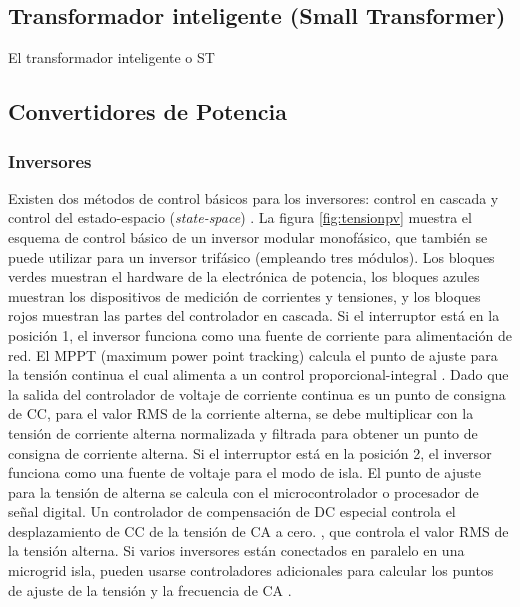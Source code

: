 \documentclass[12pt, letterpaper]{report}
\begin{document}
\subsection{Transformador inteligente (Small Transformer)}
El transformador inteligente o \ac{ST} \cite{Colak2015}


\subsection{Convertidores de Potencia}

\subsubsection{Inversores}

Existen dos métodos de control básicos para los inversores: control en cascada y
control del estado-espacio (\textit{state-space}) \cite{Bacha2015}. La figura \ref{fig:tensionpv} muestra el esquema de control básico de un inversor modular monofásico, que también se puede utilizar  para un inversor trifásico (empleando tres módulos). Los bloques verdes muestran el hardware de la electrónica de potencia, los bloques azules muestran los dispositivos de medición de corrientes y tensiones, y los bloques rojos muestran las partes del controlador en cascada.
Si el interruptor está en la posición 1, el inversor funciona como una fuente de corriente para alimentación de red. El MPPT (maximum
power point tracking) calcula el punto de ajuste para la tensión continua el cual alimenta a un control  proporcional-integral . Dado que la salida del controlador de voltaje de corriente continua es un punto de consigna de CC, para el valor RMS de la corriente alterna, se debe multiplicar con la tensión de corriente alterna normalizada y filtrada para obtener un punto de consigna de corriente alterna.
Si el interruptor está en la posición 2, el inversor funciona como una fuente de voltaje para el modo de isla. El punto de ajuste para la tensión de alterna se calcula con el microcontrolador o procesador de señal digital. Un controlador de compensación de DC especial controla el desplazamiento de CC de la tensión de CA a cero. \cite{Burger2001a}, que controla el valor RMS de la tensión alterna. Si varios inversores están conectados en paralelo en una microgrid isla, pueden usarse controladores adicionales para calcular los puntos de ajuste de la tensión y la frecuencia de CA \cite{Bacha2015} .
\end{document}
